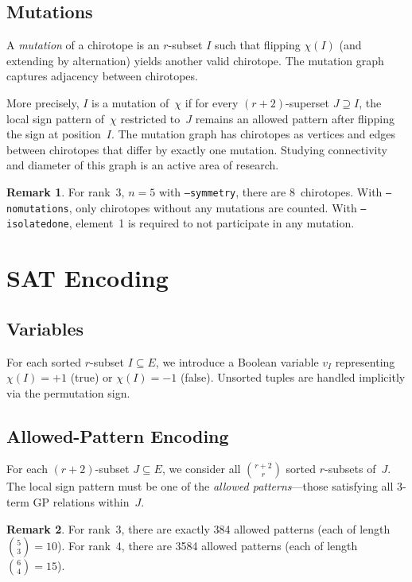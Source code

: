 \documentclass[11pt]{article}
\newcommand{\comb}[2]{\binom{#1}{#2}}
\theoremstyle{definition}
\newtheorem{remark}{Remark}
\begin{document}
\subsection{Mutations}

A \emph{mutation} of a chirotope is an $r$-subset $I$ such that flipping $\chi(I)$ (and extending by alternation) yields another valid chirotope. The mutation graph captures adjacency between chirotopes.

More precisely, $I$ is a mutation of~$\chi$ if for every $(r{+}2)$-superset $J \supseteq I$, the local sign pattern of~$\chi$ restricted to~$J$ remains an allowed pattern after flipping the sign at position~$I$. The mutation graph has chirotopes as vertices and edges between chirotopes that differ by exactly one mutation. Studying connectivity and diameter of this graph is an active area of research.

\begin{remark}
For rank~3, $n=5$ with \texttt{--symmetry}, there are 8~chirotopes. With \texttt{--nomutations}, only chirotopes without any mutations are counted. With \texttt{--isolatedone}, element~1 is required to not participate in any mutation.
\end{remark}

\section{SAT Encoding}

\subsection{Variables}

For each sorted $r$-subset $I \subseteq E$, we introduce a Boolean variable $v_I$ representing $\chi(I) = +1$ (true) or $\chi(I) = -1$ (false). Unsorted tuples are handled implicitly via the permutation sign.

\subsection{Allowed-Pattern Encoding}

For each $(r{+}2)$-subset $J \subseteq E$, we consider all $\comb{r+2}{r}$ sorted $r$-subsets of~$J$. The local sign pattern must be one of the \emph{allowed patterns}---those satisfying all 3-term GP relations within~$J$.

\begin{remark}
For rank~3, there are exactly 384 allowed patterns (each of length $\comb{5}{3} = 10$). For rank~4, there are 3584 allowed patterns (each of length $\comb{6}{4} = 15$).
\end{remark}
\end{document}
